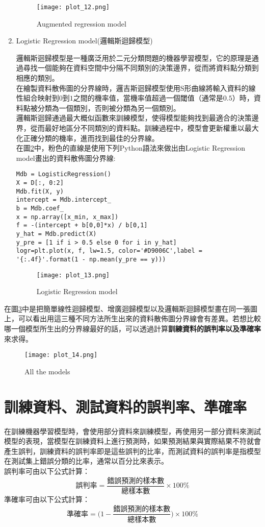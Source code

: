 \documentclass[12pt, a4paper]{article}
\begin{document}
\begin{enumerate}
\begin{figure}[h]
\centering
\texttt{[image: plot\_12.png]}
\caption{Augmented regression model}
\label{fig:plot_13.png}
\end{figure}

\item Logistic Regression model\;(邏輯斯迴歸模型)

邏輯斯迴歸模型是一種廣泛用於二元分類問題的機器學習模型，它的原理是通過尋找一個能夠在資料空間中分隔不同類別的決策邊界，從而將資料點分類到相應的類別。\\
在繪製資料散佈圖的分界線時，邏吉斯迴歸模型使用\;S\;形曲線將輸入資料的線性組合映射到\;$0$\;到\;$1$\;之間的機率值，當機率值超過一個閾值（通常是\;$0.5$\;）時，資料點被分類為一個類別，否則被分類為另一個類別。\\
邏輯斯迴歸通過最大概似函數來訓練模型，使得模型能夠找到最適合的決策邊界，從而最好地區分不同類別的資料點。訓練過程中，模型會更新權重以最大化正確分類的機率，進而找到最佳的分界線。\\
在圖\;\ref{fig:plot_14.png}\;中，粉色的直線是使用下列Python語法來做出由Logistic Regression model畫出的資料散佈圖分界線\;:
\begin{lstlisting}
Mdb = LogisticRegression()
X = D[:, 0:2]
Mdb.fit(X, y) 
intercept = Mdb.intercept_
b = Mdb.coef_
x = np.array([x_min, x_max])
f = -(intercept + b[0,0]*x) / b[0,1]
y_hat = Mdb.predict(X) 
y_pre = [1 if i > 0.5 else 0 for i in y_hat]
logr=plt.plot(x, f, lw=1.5, color='#D9006C',label = '{:.4f}'.format(1 - np.mean(y_pre == y)))
\end{lstlisting}

\begin{figure}[h]
\centering
\texttt{[image: plot\_13.png]}
\caption{Logistic Regression model}
\label{fig:plot_14.png}
\end{figure}
\end{enumerate}

在圖\;\ref{fig:plot_15.png}\;中是把簡單線性迴歸模型、增廣迴歸模型以及邏輯斯迴歸模型畫在同一張圖上，可以看出用這三種不同方法所生出來的資料散佈圖分界線會有差異。若想比較哪一個模型所生出的分界線最好的話，可以透過計算\textbf{訓練資料的誤判率以及準確率}來求得。

\begin{figure}[H]
\centering
\texttt{[image: plot\_14.png]}
\caption{All the models}
\label{fig:plot_15.png}
\end{figure}

\section{訓練資料、測試資料的誤判率、準確率}
在訓練機器學習模型時，會使用部分資料來訓練模型，再使用另一部分資料來測試模型的表現，當模型在訓練資料上進行預測時，如果預測結果與實際結果不符就會產生誤判，訓練資料的誤判率即是這些誤判的比率，而測試資料的誤判率是指模型在測試集上錯誤分類的比率，通常以百分比來表示。\\
誤判率可由以下公式計算：$$\text{誤判率}=\frac{\text{錯誤預測的樣本數}}{\text{總樣本數}}×100\%$$
準確率可由以下公式計算：$$\text{準確率}=\Big(1-\frac{\text{錯誤預測的樣本數}}{\text{總樣本數}}\Big)×100\%$$
\end{document}
